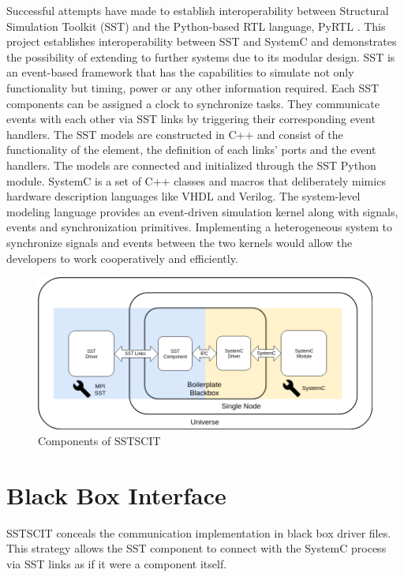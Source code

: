 \documentclass{article}
\begin{document}
  Successful attempts have made to establish interoperability between Structural Simulation Toolkit
  (SST) and the Python-based RTL language, PyRTL \cite{pyrtl-sst}. This project establishes
  interoperability between SST and SystemC and demonstrates the possibility of extending to further
  systems due to its modular design. SST is an event-based framework that has the capabilities to
  simulate not only functionality but timing, power or any other information required. Each SST
  components can be assigned a clock to synchronize tasks. They communicate events with each other
  via SST links by triggering their corresponding event handlers. The SST models are constructed in
  C++ and consist of the functionality of the element, the definition of each links' ports and the
  event handlers. The models are connected and initialized through the SST Python module. SystemC is
  a set of C++ classes and macros that deliberately mimics hardware description languages like VHDL
  and Verilog. The system-level modeling language provides an event-driven simulation kernel along
  with signals, events and synchronization primitives. Implementing a heterogeneous system to
  synchronize signals and events between the two kernels would allow the developers to work
  cooperatively and efficiently.

  \begin{figure}[!h]
    \centering
    \includegraphics[width=6in]{diagrams/comm.png}
    \caption{Components of SSTSCIT}
    \label{fig:comm}
  \end{figure}

  \section{Black Box Interface}
  SSTSCIT conceals the communication implementation in black box driver files. This strategy allows
  the SST component to connect with the SystemC process via SST links as if it were a component
  itself.
\end{document}
